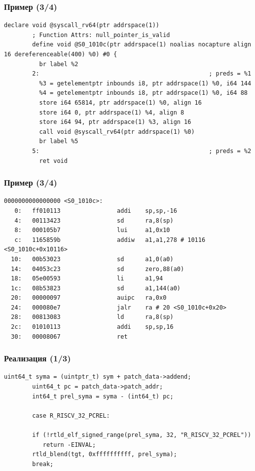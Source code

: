 \documentclass{vkr-slides-style}
\begin{document}
\begin{frame}[fragile]
    \frametitle{Пример (3/4)}
    \begin{lstlisting}[caption={./build/server/instrew --dumpir=codegen ./test/riscv64/exit}, frame=single, breaklines, basicstyle=\footnotesize]
        declare void @syscall_rv64(ptr addrspace(1))
        ; Function Attrs: null_pointer_is_valid
        define void @S0_1010c(ptr addrspace(1) noalias nocapture align 16 dereferenceable(400) %0) #0 {
          br label %2
        2:                                                ; preds = %1
          %3 = getelementptr inbounds i8, ptr addrspace(1) %0, i64 144
          %4 = getelementptr inbounds i8, ptr addrspace(1) %0, i64 88
          store i64 65814, ptr addrspace(1) %0, align 16
          store i64 0, ptr addrspace(1) %4, align 8
          store i64 94, ptr addrspace(1) %3, align 16
          call void @syscall_rv64(ptr addrspace(1) %0)
          br label %5
        5:                                                ; preds = %2
          ret void
    \end{lstlisting}
\end{frame}

\begin{frame}[fragile]
    \frametitle{Пример (3/4)}
    \begin{lstlisting}[caption={./build/server/instrew --dumpobj ./test/riscv64/exit}, frame=single, breaklines, basicstyle=\footnotesize]
        0000000000000000 <S0_1010c>:
   0:   ff010113                addi    sp,sp,-16
   4:   00113423                sd      ra,8(sp)
   8:   000105b7                lui     a1,0x10
   c:   1165859b                addiw   a1,a1,278 # 10116 <S0_1010c+0x10116>
  10:   00b53023                sd      a1,0(a0)
  14:   04053c23                sd      zero,88(a0)
  18:   05e00593                li      a1,94
  1c:   08b53823                sd      a1,144(a0)
  20:   00000097                auipc   ra,0x0
  24:   000080e7                jalr    ra # 20 <S0_1010c+0x20>
  28:   00813083                ld      ra,8(sp)
  2c:   01010113                addi    sp,sp,16
  30:   00008067                ret

    \end{lstlisting}
\end{frame}

\begin{frame}[fragile]
    \frametitle{Реализация (1/3)}
    \begin{lstlisting}[caption={Релокация}, frame=single, breaklines, basicstyle=\footnotesize]
        uint64_t syma = (uintptr_t) sym + patch_data->addend;
        uint64_t pc = patch_data->patch_addr;
        int64_t prel_syma = syma - (int64_t) pc;

        case R_RISCV_32_PCREL:

        if (!rtld_elf_signed_range(prel_syma, 32, "R_RISCV_32_PCREL"))
           return -EINVAL;
        rtld_blend(tgt, 0xffffffffff, prel_syma);
        break;
    \end{lstlisting}
\end{frame}
\end{document}
